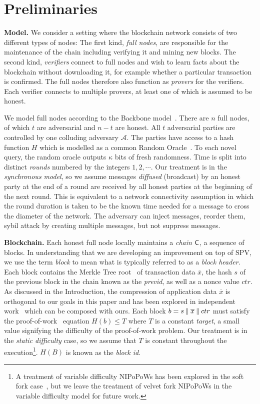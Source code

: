 \section{Preliminaries}\label{sec:preliminaries}

\noindent
\textbf{Model.}
We consider a setting where the blockchain network consists of two different
types of nodes: The first kind, \emph{full nodes}, are responsible for the
maintenance of the chain including verifying it and mining new blocks. The
second kind, \emph{verifiers} connect to full nodes and wish to learn facts
about the blockchain without downloading it, for example whether a particular
transaction is confirmed. The full nodes therefore also function as
\emph{provers} for the verifiers. Each verifier connects to multiple provers, at
least one of which is assumed to be honest.

We model full nodes according to the Backbone model~\cite{backbone}. There are
$n$ full nodes, of which $t$ are adversarial and $n - t$ are honest. All $t$
adversarial parties are controlled by one colluding adversary $\mathcal{A}$. The
parties have access to a hash function $H$ which is modelled as a common Random
Oracle~\cite{ro}. To each novel query, the random oracle outputs $\kappa$ bits
of fresh randomness. Time is split into distinct \emph{rounds} numbered by the
integers $1, 2, \cdots$. Our treatment is in the \emph{synchronous model}, so we
assume messages \emph{diffused} (broadcast) by an honest party at the end of a
round are received by all honest parties at the beginning of the next round.
This is equivalent to a network connectivity assumption in which the round
duration is taken to be the known time needed for a message to cross the
diameter of the network. The adversary can inject messages, reorder them, sybil
attack by creating multiple messages, but not suppress messages.

\noindent
\textbf{Blockchain.} Each honest full node locally maintains a \emph{chain} $\mathsf{C}$, a sequence of
blocks. In understanding that we are developing an improvement on top of SPV, we
use the term \emph{block} to mean what is typically referred to as a
\emph{block header}. Each block contains the Merkle Tree root~\cite{merkle} of
transaction data $\overline{x}$, the hash $s$ of the previous block in the chain
known as the \emph{previd}, as well as a nonce value $ctr$. As discussed in the
Introduction, the compression of application data $\overline{x}$ is orthogonal
to our goals in this paper and has been explored in independent
work~\cite{edrax} which can be composed with ours. Each block $b = s \mathbin{\|}
\overline{x} \mathbin{\|} ctr$ must satisfy the proof-of-work~\cite{pow} equation $H(b) \leq T$
where $T$ is a constant \emph{target}, a small value signifying the difficulty
of the proof-of-work problem. Our treatment is in the \emph{static difficulty}
case, so we assume that $T$ is constant throughout the execution\footnote{A
treatment of variable difficulty NIPoPoWs has been explored in the soft fork
case~\cite{dionyziz}, but we leave the treatment of velvet fork NIPoPoWs in the
variable difficulty model for future work.}. $H(B)$ is
known as the \emph{block id}.

